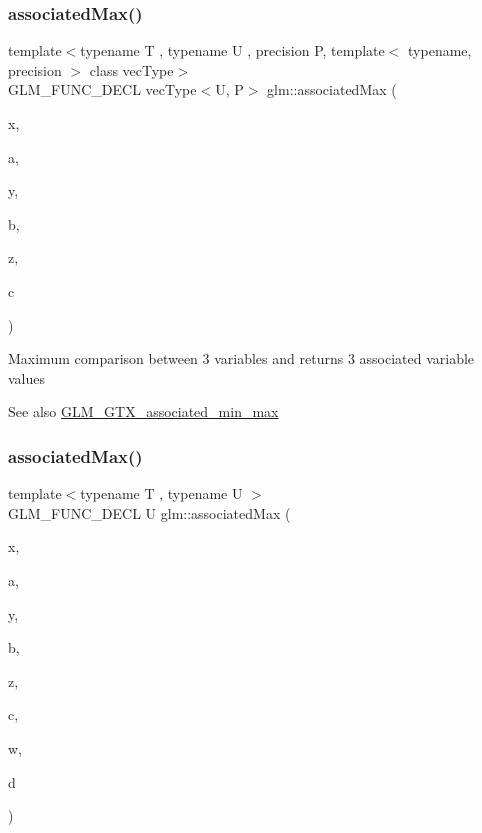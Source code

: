 \subsubsection{\texorpdfstring{associated\+Max()}{associatedMax()}\hspace{0.1cm}{\footnotesize\ttfamily [8/12]}}
{\footnotesize\ttfamily template$<$typename T , typename U , precision P, template$<$ typename, precision $>$ class vec\+Type$>$ \\
G\+L\+M\+\_\+\+F\+U\+N\+C\+\_\+\+D\+E\+CL vec\+Type$<$U, P$>$ glm\+::associated\+Max (\begin{DoxyParamCaption}\item[{vec\+Type$<$ T, P $>$ const \&}]{x,  }\item[{U}]{a,  }\item[{vec\+Type$<$ T, P $>$ const \&}]{y,  }\item[{U}]{b,  }\item[{vec\+Type$<$ T, P $>$ const \&}]{z,  }\item[{U}]{c }\end{DoxyParamCaption})}

Maximum comparison between 3 variables and returns 3 associated variable values \begin{DoxySeeAlso}{See also}
\hyperlink{group__gtx__associated__min__max}{G\+L\+M\+\_\+\+G\+T\+X\+\_\+associated\+\_\+min\+\_\+max} 
\end{DoxySeeAlso}
\mbox{\label{group__gtx__associated__min__max_ga3038ffcb43eaa6af75897a99a5047ccc}} 
\subsubsection{\texorpdfstring{associated\+Max()}{associatedMax()}\hspace{0.1cm}{\footnotesize\ttfamily [9/12]}}
{\footnotesize\ttfamily template$<$typename T , typename U $>$ \\
G\+L\+M\+\_\+\+F\+U\+N\+C\+\_\+\+D\+E\+CL U glm\+::associated\+Max (\begin{DoxyParamCaption}\item[{T}]{x,  }\item[{U}]{a,  }\item[{T}]{y,  }\item[{U}]{b,  }\item[{T}]{z,  }\item[{U}]{c,  }\item[{T}]{w,  }\item[{U}]{d }\end{DoxyParamCaption})}

